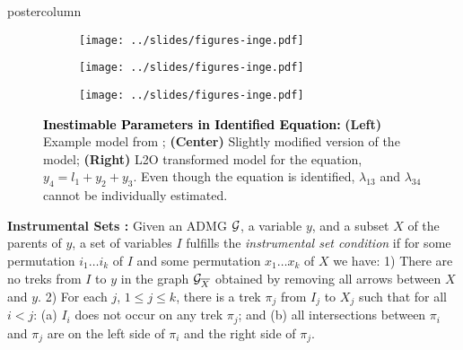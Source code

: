 \documentclass{beamer}
\newlength{\columnheight}
\begin{document}
\begin{frame}
\begin{columns}
	\begin{column}{0.33\textwidth}
		\begin{beamercolorbox}[center]{postercolumn}
			\begin{minipage}{.98\textwidth} %
				\parbox[t][\columnheight]{\textwidth}{ %
				\begin{myblock}{}
					\begin{figure}
						\begin{subfigure}{0.33 \linewidth}
							\centering
							\texttt{[image: ../slides/figures-inge.pdf]}
						\end{subfigure}%
						\begin{subfigure}{0.33 \linewidth}
							\centering
							\texttt{[image: ../slides/figures-inge.pdf]}
						\end{subfigure}%
						\begin{subfigure}{0.33 \linewidth}
							\centering
							\texttt{[image: ../slides/figures-inge.pdf]}
						\end{subfigure}
						\caption*{\textbf{\textcolor{black}{Inestimable Parameters in Identified Equation:}} \textbf{(Left)} Example model 
						from \citet{griliches1977estimating}; \textbf{(Center)} Slightly modified version of the model; \textbf{(Right)} L2O transformed
						model for the equation, $ y_4 = l_1 + y_2 + y_3 $. Even though the equation is identified, $ \lambda_{13} $ and 
						$ \lambda_{34} $ cannot be individually estimated.}
					\end{figure}
					\vspace{-1em}
				\end{myblock}
	\begin{myblock}{}
		\textbf{Instrumental Sets \citep{BritoP02}:}
		\justifying Given an ADMG $\cal
			G$, a variable $y$, and a subset $X$ of the parents of $y$, 
			a set of variables
			$I$ fulfills the 
			\emph{instrumental set condition}
			if for {some} permutation $ i_1 \ldots i_k $ of
			$ I $ and {some} permutation
			$ x_1 \ldots x_k $ of $ X $ we have: 1) There are no treks from $I$ to $y$ in the graph ${\cal
					G}_{\overline{X}}$ obtained by removing all arrows 
					between $X$ and $y$.  2) For each $j$, $1 \leq j \leq k$, there is a trek $\pi_j$ from
					$I_j$ to $X_j$ such that for all $i < j$: (a) $I_i$ does not
					occur on any trek $\pi_j$; and (b) all intersections between
					$\pi_i$ and $\pi_j$ are on the left side of $\pi_i$ and the
					right side of $\pi_j$.


\end{myblock}}
\end{minipage}
\end{beamercolorbox}
\end{column}
\end{columns}
\end{frame}
\end{document}
